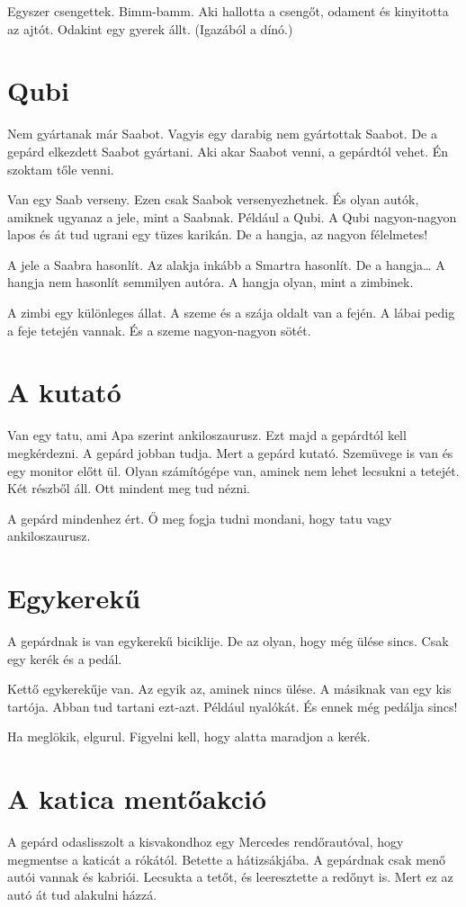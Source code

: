 \documentclass[12pt]{memoir}
\newcommand{\image}[1]{%
\incgraph[documentpaper][keepaspectratio=true,width=\paperwidth,height=\paperheight]{gepard/#1}}
\begin{document}
Egyszer csengettek. Bimm-bamm. Aki hallotta a csengőt, odament és kinyitotta az
ajtót. Odakint egy gyerek állt. (Igazából a dínó.)
\cleartoverso


\section{Qubi}
Nem gyártanak már Saabot. Vagyis egy darabig nem gyártottak Saabot. De a gepárd
elkezdett Saabot gyártani. Aki akar Saabot venni, a gepárdtól vehet. Én szoktam
tőle venni.

Van egy Saab verseny. Ezen csak Saabok versenyezhetnek. És olyan autók, amiknek
ugyanaz a jele, mint a Saabnak. Például a Qubi. A Qubi nagyon-nagyon lapos és
át tud ugrani egy tüzes karikán. De a hangja, az nagyon félelmetes!

A jele a Saabra hasonlít. Az alakja inkább a Smartra hasonlít. De a hangja… A
hangja nem hasonlít semmilyen autóra. A hangja olyan, mint a zimbinek.

A zimbi egy különleges állat. A szeme és a szája oldalt van a fején. A lábai
pedig a feje tetején vannak. És a szeme nagyon-nagyon sötét.
\image{qubi.png}


\section{A kutató}
Van egy tatu, ami Apa szerint ankiloszaurusz. Ezt majd a gepárdtól kell
megkérdezni. A gepárd jobban tudja. Mert a gepárd kutató. Szemüvege is van és
egy monitor előtt ül. Olyan számítógépe van, aminek nem lehet lecsukni a
tetejét. Két részből áll. Ott mindent meg tud nézni.

A gepárd mindenhez ért. Ő meg fogja tudni mondani, hogy tatu vagy
ankiloszaurusz.
\cleartoverso


\section{Egykerekű}
A gepárdnak is van egykerekű biciklije. De az olyan, hogy még ülése sincs. Csak
egy kerék és a pedál.

Kettő egykerekűje van. Az egyik az, aminek nincs ülése. A másiknak van egy kis
tartója. Abban tud tartani ezt-azt. Például nyalókát. És ennek még pedálja
sincs!

Ha meglökik, elgurul. Figyelni kell, hogy alatta maradjon a kerék.
\image{egykereku.png}


\section{A katica mentőakció}
A gepárd odaslisszolt a kisvakondhoz egy Mercedes rendőrautóval, hogy megmentse
a katicát a rókától. Betette a hátizsákjába. A gepárdnak csak menő autói vannak
és kabriói. Lecsukta a tetőt, és leeresztette a redőnyt is. Mert ez az autó át
tud alakulni házzá.
\end{document}
